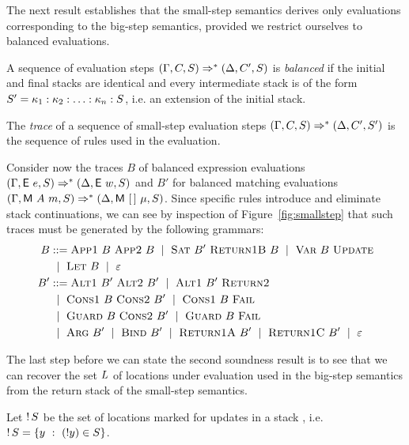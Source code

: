   The next result establishes that the small-step semantics
  derives only evaluations corresponding to the
  big-step semantics, provided we restrict ourselves
  to balanced evaluations.

  \begin{definition}
    A sequence of evaluation steps
    $(\Gamma,C,S) \Rightarrow^{*}
    (\Delta,C',S)$ is \emph{balanced} if
    the initial and final stacks are identical and every intermediate
    stack is of the form $S' = \kappa_1:\kappa_2:\ldots:\kappa_n:S$, i.e.\@
    an extension of the initial stack.
  \end{definition}

  \begin{definition}
    The \emph{trace} of a sequence of small-step evaluation
    steps $(\Gamma,C,S) \Rightarrow^{*}
    (\Delta,C',S')$ is the sequence of rules used in the evaluation.
  \end{definition}

  Consider now the traces $B$ of balanced expression evaluations
  $(\Gamma,\textsf{E}~e,S)\Rightarrow^{*}(\Delta,\textsf{E}~w,S)$
  and $B'$ for balanced matching evaluations
  $(\Gamma,\textsf{M}~A~m,S)\Rightarrow^{*}(\Delta,\textsf{M}~[\,]~\mu,S)$. Since
  specific rules introduce and eliminate stack continuations, we can
  see by inspection of Figure~\ref{fig:smallstep} that such traces
  must be generated by the following grammars:
\begin{align}
  B &::= \textsc{App1}~ B~ \textsc{App2}~B ~\mid~
      \textsc{Sat}~B'~ \textsc{Return1B}~B
      ~\mid~ \textsc{Var}~B ~ \textsc{Update} \notag \\
  &~\mid~ \textsc{Let}~B ~\mid~ \varepsilon  \label{eq:bal-expr}\\
  B' &::= \textsc{Alt1}~B'~\textsc{Alt2}~B' ~\mid~
       \textsc{Alt1}~B'~\textsc{Return2} \notag \\
    &~\mid~ \textsc{Cons1}~ B ~\textsc{Cons2}~B' ~\mid~
      \textsc{Cons1}~ B~ \textsc{Fail} \notag \\
    & ~\mid~ \textsc{Guard}~ B ~\textsc{Cons2}~B' ~\mid~
      \textsc{Guard}~ B~ \textsc{Fail}\notag \\
    &~\mid~ \textsc{Arg}~ B' ~\mid~ \textsc{Bind}~B' 
      ~\mid~ \textsc{Return1A}~B' ~\mid~ \textsc{Return1C}~B' ~\mid~ \varepsilon
      \label{eq:bal-matching}
\end{align}

The last step before we can state the second soundness result is
to see that we can recover the set $L$ of locations under evaluation
used in the big-step semantics from the return stack of the small-step
semantics.
\begin{definition}
  Let $\mathop{!}{S}$
  be the set of locations marked
  for updates in a stack \retstack, i.e.\@
  $\mathop{!}{S} = \{ y ~:~ (!y) \in S \}$.
\end{definition}

